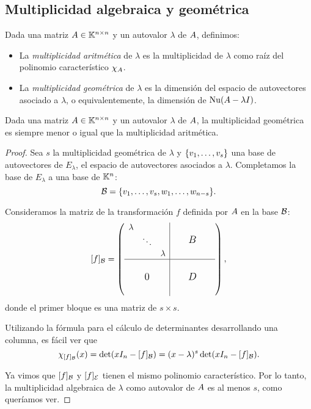 \subsection{Multiplicidad algebraica y geométrica}
Dada una matriz $\Ab \in \Knn$ y un autovalor $\lambda$ de $\Ab$, definimos:
\begin{itemize}
\item La \emph{multiplicidad aritmética} de $\lambda$ es la multiplicidad de $\lambda$ como raíz del polinomio característico $\chi_{\Ab}$.
\item La \emph{multiplicidad geométrica} de $\lambda$ es la dimensión del espacio de autovectores asociado a $\lambda$, o equivalentemente, la dimensión de $\Nu(\Ab - \lambda \Ib)$.
\end{itemize}

\begin{prop}
Dada una matriz $\Ab \in  \Knn$ y un autovalor $\lambda$ de $\Ab$, la multiplicidad geométrica es siempre menor o igual que la multiplicidad aritmética.
\end{prop}

\begin{proof} Sea $s$ la multiplicidad geométrica de $\lambda$ y $\{\vb_1, \dots, \vb_s\}$ una base de autovectores de $E_{\lambda}$, el espacio de autovectores asociados a $\lambda$. Completamos la base de $E_{\lambda}$ a una base de $\mathbb K^{n}$:
$$
\B = \{\vb_1, \dots, \vb_s, \wb_1, \dots, \wb_{n-s}\}.
$$

Consideramos la matriz de la transformación $f$ definida por $\Ab$ en la base $\mathcal B$:
$$
\sbox0{$\begin{matrix}\lambda & & \\ & \ddots & \\ & & \lambda\end{matrix}$}
[f]_\B =\left(
\begin{array}{c|c}
\usebox{0}&\makebox[\wd0]{\large $B$}\\
\hline
  \vphantom{\usebox{0}}\makebox[\wd0]{\large $0$}&\makebox[\wd0]{\large $D$}
\end{array}
\right),
$$
donde el primer bloque es una matriz de $s \times s$.

Utilizando la fórmula para el cálculo de determinantes desarrollando una columna, es fácil ver que
$$
\chi_{[f]_\B}(x) = \det(x\Ib_n - [f]_\B) = (x-\lambda)^s \det (x\Ib_n - [f]_\B).$$

 Ya vimos que $[f]_\mathcal B$ y $[f]_\mathcal E$ tienen el mismo polinomio característico. Por lo tanto, la multiplicidad algebraica de $\lambda$ como autovalor de $\Ab$ es al menos $s$, como queríamos ver.
\end{proof}

